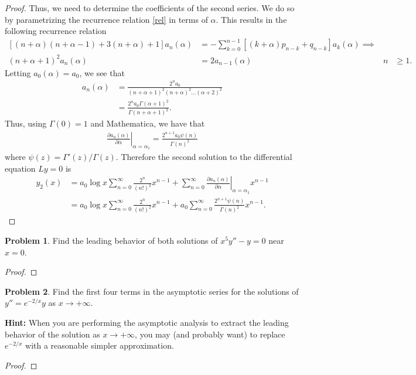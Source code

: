 \documentclass[12pt]{article}
\theoremstyle{definition}
\newtheorem{problem}{Problem}
\begin{document}
\begin{proof}
  Thus, we need to determine the coefficients of the second series. We do so by parametrizing the recurrence relation \eqref{rel} in terms of $\alpha$.
  This results in the following recurrence relation
  \begin{align*}
    \left[(n+\alpha)(n+\alpha-1) + 3(n+\alpha) +1  \right] a_n(\alpha) &= - \sum_{k=0}^{n-1}\left[(k+\alpha)p_{n-k} + q_{n-k}\right]a_k(\alpha)\implies & &\\
    (n+\alpha +1)^2 a_n(\alpha)&=2a_{n-1}(\alpha) &n &\geq1.
  \end{align*}
  Letting $a_0(\alpha) = a_0$,  we see that
  \begin{align*}
    a_n(\alpha) &= \frac{2^n a_0}{(n+\alpha+1)^2(n+\alpha)^2\dots(\alpha+2)^2} \\
    &=\frac{2^n a_0 \Gamma(\alpha+1)^2}{\Gamma(n+\alpha+1)^2}.
  \end{align*}
  Thus, using $\Gamma(0)=1$ and Mathematica, we have that
  \begin{align*}
    \left.\frac{\partial a_n(\alpha)}{\partial \alpha}\right|_{\alpha=\alpha_1} = \frac{2^{n+1} a_0 \psi(n)}{\Gamma(n)^2}
  \end{align*}
  where $\psi(z) = \Gamma'(z)/\Gamma(z)$. Therefore the second solution to the differential equation $Ly=0$ is
  \begin{align*}
    y_2(x)&=a_0\log x\sum_{n=0}^{\infty} \frac{2^n}{(n!)^2}x^{n-1} + \sum_{n=0}^{\infty}\left.\frac{\partial a_n(\alpha)}{\partial \alpha}\right|_{\alpha=\alpha_1}x^{n-1}\\
    &=a_0\log x\sum_{n=0}^{\infty} \frac{2^n}{(n!)^2}x^{n-1} + a_0\sum_{n=0}^{\infty}\frac{2^{n+1} \psi(n)}{\Gamma(n)^2}x^{n-1}.
  \end{align*}
\end{proof}
\newpage


\begin{problem}
  Find the leading behavior of both solutions of $x^5y'' - y = 0$ near $x=0$.
\end{problem}

\begin{proof}
\end{proof}
\newpage


\begin{problem}
  Find the first four terms in the asymptotic series for the solutions of $y'' = e^{-2/x}y$ as $x\to + \infty$.

  \textbf{Hint:} When you are performing the asymptotic analysis to extract the leading
  behavior of the solution as $x\to  + \infty$, you may (and probably want) to replace
  $e^{-2/x}$ with a reasonable simpler approximation.
\end{problem}

\begin{proof}
\end{proof}
\newpage
\end{document}
